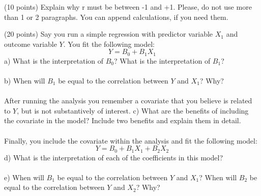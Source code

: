 \documentclass[onecolumn,10pt]{jhwhw}
\begin{document}
\problem{}
(10 points) Explain why r must be between -1 and +1. Please, do not use more than 1 or 2 paragraphs. You can append calculations, if you need them.

\problem{}
(20 points) Say you run a simple regression with predictor variable $X_1$ and outcome variable $Y$. You fit the following model:
                $$Y = B_0 + B_1 X_1$$
a) What is the interpretation of $B_0$? What is the interpretation of $B_1$?\\
\\
b) When will $B_1$ be equal to the correlation between $Y$ and $X_1$? Why?\\
\\
After running the analysis you remember a covariate that you believe is related to $Y$, but is not substantively of interest.
c) What are the benefits of including the covariate in the model? Include two benefits and explain them in detail.\\
\\
Finally, you include the covariate within the analysis and fit the following model:
                $$Y = B_0 + B_1 X_1 + B_2 X_2$$
d) What is the interpretation of each of the coefficients in this model?\\
\\
e) When will $B_1$ be equal to the correlation between $Y$ and $X_1$? When will $B_2$ be equal to the correlation between $Y$ and $X_2$? Why?
\end{document}
